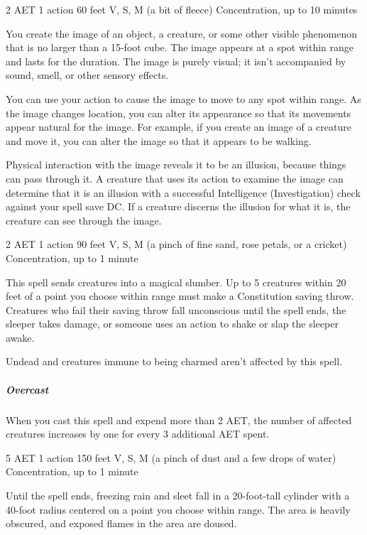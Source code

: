 {2 AET}
{1 action}
{60 feet}
{V, S, M (a bit of fleece)}
{Concentration, up to 10 minutes}

You create the image of an object, a creature, or some other visible phenomenon that is no larger than a 15-foot cube. The image appears at a spot within range and lasts for the duration. The image is purely visual; it isn't accompanied by sound, smell, or other sensory effects.

You can use your action to cause the image to move to any spot within range. As the image changes location, you can alter its appearance so that its movements appear natural for the image. For example, if you create an image of a creature and move it, you can alter the image so that it appears to be walking.

Physical interaction with the image reveals it to be an illusion, because things can pass through it. A creature that uses its action to examine the image can determine that it is an illusion with a successful Intelligence (Investigation) check against your spell save DC. If a creature discerns the illusion for what it is, the creature can see through the image.


{2 AET}
{1 action}
{90 feet}
{V, S, M (a pinch of fine sand, rose petals, or a cricket)}
{Concentration, up to 1 minute}

This spell sends creatures into a magical slumber. Up to 5 creatures within 20 feet of a point you choose within range must make a Constitution saving throw. Creatures who fail their saving throw fall unconscious until the spell ends, the sleeper takes damage, or someone uses an action to shake or slap the sleeper awake.

Undead and creatures immune to being charmed aren't affected by this spell.

\subparagraph*{Overcast} When you cast this spell and expend more than 2 AET, the number of affected creatures increases by one for every 3 additional AET spent.


{5 AET}
{1 action}
{150 feet}
{V, S, M (a pinch of dust and a few drops of water)}
{Concentration, up to 1 minute}

Until the spell ends, freezing rain and sleet fall in a 20-foot-tall cylinder with a 40-foot radius centered on a point you choose within range. The area is heavily obscured, and exposed flames in the area are doused.

